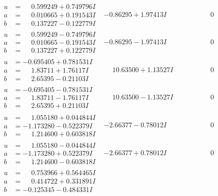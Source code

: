 \documentclass[1p]{elsarticle_modified}
\theoremstyle{definition}
\begin{document}
$$\begin{array}{c|c|c}
\begin{aligned}
u &= \phantom{-}0.599249 + 0.749796 I \\
a &= \phantom{-}0.010665 + 0.191543 I \\
b &= \phantom{-}0.137227 - 0.122779 I\end{aligned}
 & -0.86295 + 1.97413 I & \phantom{-0.000000 } 0 \\ \hline\begin{aligned}
u &= \phantom{-}0.599249 - 0.749796 I \\
a &= \phantom{-}0.010665 - 0.191543 I \\
b &= \phantom{-}0.137227 + 0.122779 I\end{aligned}
 & -0.86295 - 1.97413 I & \phantom{-0.000000 } 0 \\ \hline\begin{aligned}
u &= -0.695405 + 0.781531 I \\
a &= \phantom{-}1.83711 + 1.76117 I \\
b &= \phantom{-}2.65395 - 0.21103 I\end{aligned}
 & \phantom{-}10.63500 + 1.13527 I & \phantom{-0.000000 } 0 \\ \hline\begin{aligned}
u &= -0.695405 - 0.781531 I \\
a &= \phantom{-}1.83711 - 1.76117 I \\
b &= \phantom{-}2.65395 + 0.21103 I\end{aligned}
 & \phantom{-}10.63500 - 1.13527 I & \phantom{-0.000000 } 0 \\ \hline\begin{aligned}
u &= \phantom{-}1.055180 + 0.044844 I \\
a &= -1.173280 - 0.522379 I \\
b &= \phantom{-}1.214600 + 0.603818 I\end{aligned}
 & -2.66377 - 0.78012 I & \phantom{-0.000000 } 0 \\ \hline\begin{aligned}
u &= \phantom{-}1.055180 - 0.044844 I \\
a &= -1.173280 + 0.522379 I \\
b &= \phantom{-}1.214600 - 0.603818 I\end{aligned}
 & -2.66377 + 0.78012 I & \phantom{-0.000000 } 0 \\ \hline\begin{aligned}
u &= \phantom{-}0.753966 + 0.564465 I \\
a &= \phantom{-}0.414722 + 0.331891 I \\
b &= -0.125345 - 0.484331 I\end{aligned}

\end{array}$$
\end{document}
